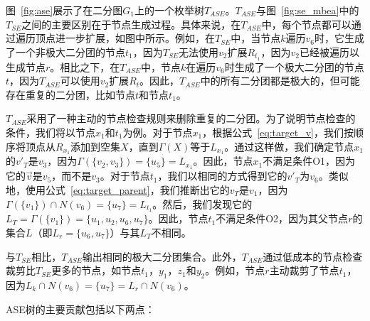 \begin{example}
  图~\ref{fig:ase}展示了在二分图$G_1$上的一个枚举树$T_{ASE}$。$T_{ASE}$与图~\ref{fig:se_mbea}中的$T_{SE}$之间的主要区别在于节点生成过程。具体来说，在$T_{ASE}$中，每个节点都可以通过遍历顶点进一步扩展，如图中所示。例如，在$T_{SE}$中，当节点$k$遍历$v_6$时，它生成了一个非极大二分团的节点$t_1$，因为$T_{SE}$无法使用$v_2$扩展$R_{t_1}$，因为$v_2$已经被遍历以生成节点$r$。相比之下，在$T_{ASE}$中，节点$k$在遍历$v_6$时生成了一个极大二分团的节点$t$，因为$T_{ASE}$可以使用$v_2$扩展$R_{t}$。因此，$T_{ASE}$中的所有二分团都是极大的，但可能存在重复的二分团，比如节点$t$和节点$t_1$。

  $T_{ASE}$采用了一种主动的节点检查规则来删除重复的二分团。为了说明节点检查的条件，我们将以节点$x_1$和$t_1$为例。对于节点$x_1$，根据公式~\ref{eq:target_v}，我们按顺序将顶点从$R_{x_1}$添加到空集$X$，直到$\Gamma(X)$等于$L_{x_1}$。通过这样做，我们确定节点$x_1$的$v'_T$是$v_3$，因为$\Gamma(\{v_2,v_3\}) = \{u_5\}=L_{x_1}$。因此，节点$x_1$不满足条件O1，因为它的$\vec{v}$是$v_5$，而不是$v_3$。对于节点$t_1$，我们以相同的方式得到它的$v'_T$为$v_6$。类似地，使用公式~\ref{eq:target_parent}，我们推断出它的$v_T$是$v_1$，因为$\Gamma(\{v_1\}) \cap N(v_6) = \{u_7\}=L_{t_1}$。然后，我们发现它的$L_T = \Gamma(\{v_1\}) = \{u_1, u_2, u_6, u_7\}$。因此，节点$t_1$不满足条件O2，因为其父节点$r$的集合$L$（即$L_r=\{u_6, u_7\}$）与其$L_T$不相同。
  
  与$T_{SE}$相比，$T_{ASE}$输出相同的极大二分团集合。此外，$T_{ASE}$通过低成本的节点检查裁剪比$T_{SE}$更多的节点，如节点$t_1$，$y_1$，$z_1$和$y_2$。例如，节点$r$主动裁剪了节点$t_1$，因为$L_k \cap N(v_6) = \{u_7\} = L_r \cap N(v_6)$。





\end{example}

ASE树的主要贡献包括以下两点：

